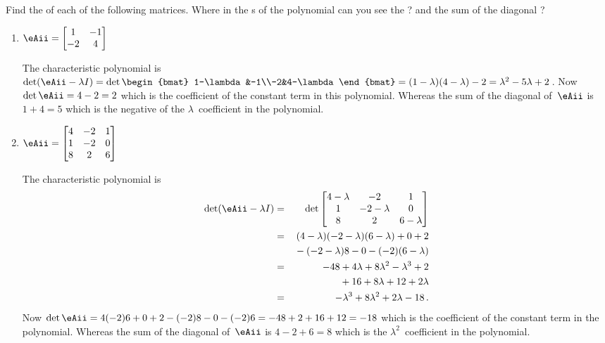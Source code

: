 \begin{example} 
Find the  of each of the following matrices.  
Where in the s of the polynomial can you see the ? and the sum of the diagonal ?
\begin{enumerate}
\item \(\eAii=\begin{bmatrix} 1&-1\\-2&4 \end{bmatrix}\)
\begin{solution} 
The characteristic polynomial is \(\det(\eAii-\lambda I)
=\det\begin{bmat} 1-\lambda&-1\\-2&4-\lambda \end{bmat}
=(1-\lambda)(4-\lambda)-2
=\lambda^2-5\lambda+2\)\,.
Now \(\det \eAii=4-2=2\) which is the coefficient of the constant term in this polynomial.
Whereas the sum of the diagonal of~\(\eAii\) is \(1+4=5\) which is the negative of the \(\lambda\)~coefficient in the polynomial.
\end{solution}

\item \(\eAii=\begin{bmatrix}4&-2&1
\\1&-2&0
\\8&2&6 \end{bmatrix}\)
\begin{solution} 
The characteristic polynomial is 
\begin{eqnarray*}
\det(\eAii-\lambda I)
&=&\det\begin{bmatrix} 4-\lambda&-2&1
\\1&-2-\lambda&0
\\8&2&6-\lambda \end{bmatrix}
\\&=&(4-\lambda)(-2-\lambda)(6-\lambda)+0+2
\\&&{}
-(-2-\lambda)8-0-(-2)(6-\lambda)
\\&=&-48+4\lambda+8\lambda^2-\lambda^3+2
\\&&{}
+16+8\lambda+12+2\lambda
\\&=&-\lambda^3+8\lambda^2+2\lambda-18\,.
\end{eqnarray*}
Now \(\det \eAii=4(-2)6+0+2-(-2)8-0-(-2)6=-48+2+16+12=-18\) which is the coefficient of the constant term in the polynomial.
Whereas the sum of the diagonal of~\(\eAii\) is \(4-2+6=8\) which is the \(\lambda^2\)~coefficient in the polynomial.
\end{solution}

\end{enumerate}
\end{example}




